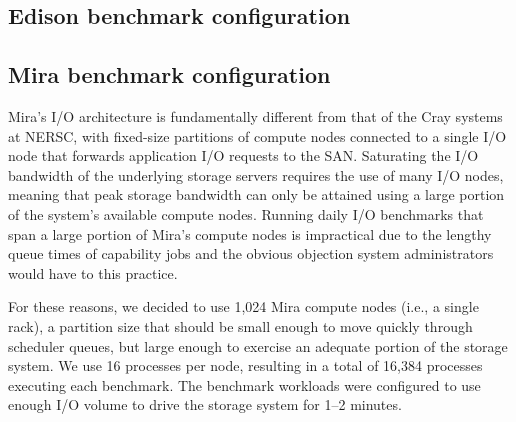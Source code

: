 \subsection{Edison benchmark configuration} \label{sec:platforms/mirabenchmarks}

\subsection{Mira benchmark configuration} \label{sec:platforms/mirabenchmarks}

Mira's I/O architecture is fundamentally different from that of the Cray
systems at NERSC, with fixed-size partitions of compute nodes connected to
a single I/O node that forwards application I/O requests to the SAN.
Saturating the I/O bandwidth of the underlying storage servers requires the
use of many I/O nodes, meaning that peak storage bandwidth can only be
attained using a large portion of the system's available compute nodes.
Running daily I/O benchmarks that span a large portion of Mira's compute
nodes is impractical due to the lengthy queue times of capability jobs and
the obvious objection system administrators would have to this practice.

For these reasons, we decided to use 1,024 Mira compute nodes (i.e., a single
rack), a partition size that should be small enough to move quickly through
scheduler queues, but large enough to exercise an adequate portion of the
storage system. We use 16 processes per node, resulting in a total of 16,384
processes executing each benchmark. The benchmark workloads were configured
to use enough I/O volume to drive the storage system for 1--2 minutes.
